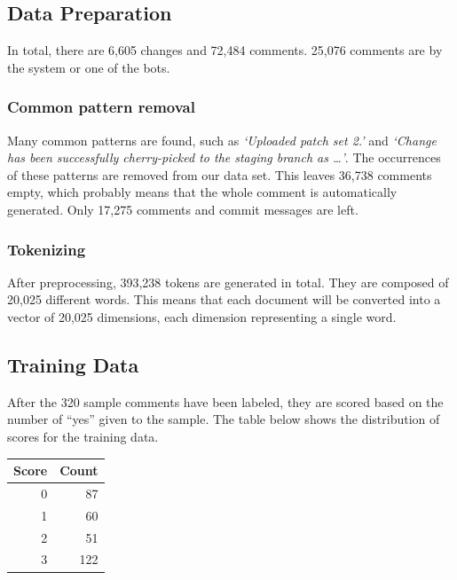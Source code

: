 \documentclass[conference]{IEEEtran}
\begin{document}
\subsection{Data Preparation}

In total, there are 6,605 changes and 72,484 comments. 25,076 comments are by the system or one of the bots.

\subsubsection{Common pattern removal}

Many common patterns are found, such as \emph{`Uploaded patch set 2.'} and \emph{`Change has been successfully cherry-picked to the staging branch as \dots'}.
The occurrences of these patterns are removed from our data set.
This leaves 36,738 comments empty, which probably means that the whole comment is automatically generated.
Only 17,275 comments and commit messages are left.

\subsubsection{Tokenizing}

After preprocessing, 393,238 tokens are generated in total. They are composed of 20,025 different words.
This means that each document will be converted into a vector of 20,025 dimensions, each dimension representing a single word.



\subsection{Training Data}

After the 320 sample comments have been labeled,
they are scored based on the number of ``yes'' given to the sample.
The table below shows the distribution of scores for the training data.


\begin{center}
\begin{tabular}{|r|r|}
\hline
\bfseries Score & \bfseries Count \\
\hline
0 & 87 \\ 1 & 60 \\ 2 & 51 \\ 3 & 122 \\
\hline
\end{tabular}
\end{center}
\end{document}
